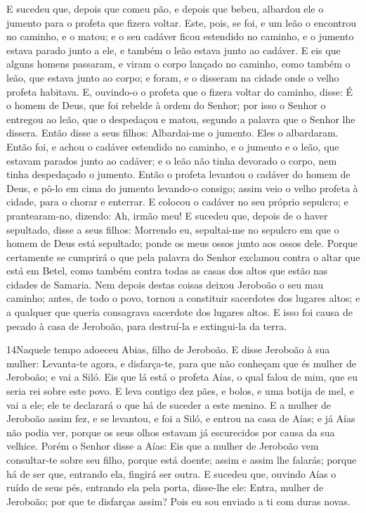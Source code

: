 E sucedeu que, depois que comeu pão, e depois que bebeu, albardou
ele o jumento para o profeta que fizera voltar. Este, pois,
se foi, e um leão o encontrou no caminho, e o matou; e o seu cadáver
ficou estendido no caminho, e o jumento estava parado junto a ele, e
também o leão estava junto ao cadáver. E eis que alguns
homens passaram, e viram o corpo lançado no caminho, como também o
leão, que estava junto ao corpo; e foram, e o disseram na cidade
onde o velho profeta habitava. E, ouvindo-o o profeta que o
fizera voltar do caminho, disse: É o homem de Deus, que foi rebelde
à ordem do Senhor; por isso o Senhor o entregou ao leão, que o
despedaçou e matou, segundo a palavra que o Senhor lhe dissera.
Então disse a seus filhos: Albardai-me o jumento. Eles o
albardaram. Então foi, e achou o cadáver estendido no
caminho, e o jumento e o leão, que estavam parados junto ao cadáver;
e o leão não tinha devorado o corpo, nem tinha despedaçado o
jumento. Então o profeta levantou o cadáver do homem de Deus,
e pô-lo em cima do jumento levando-o consigo; assim veio o velho
profeta à cidade, para o chorar e enterrar. E colocou o
cadáver no seu próprio sepulcro; e prantearam-no, dizendo: Ah, irmão
meu! E sucedeu que, depois de o haver sepultado, disse a seus
filhos: Morrendo eu, sepultai-me no sepulcro em que o homem de Deus
está sepultado; ponde os meus ossos junto aos ossos dele.
Porque certamente se cumprirá o que pela palavra do Senhor
exclamou contra o altar que está em Betel, como também contra todas
as casas dos altos que estão nas cidades de Samaria. Nem
depois destas coisas deixou Jeroboão o seu mau caminho; antes, de
todo o povo, tornou a constituir sacerdotes dos lugares altos; e a
qualquer que queria consagrava sacerdote dos lugares altos. E
isso foi causa de pecado à casa de Jeroboão, para destruí-la e
extingui-la da terra.

\medskip

\lettrine{14} Naquele tempo adoeceu Abias, filho de Jeroboão.
E disse Jeroboão à sua mulher: Levanta-te agora, e disfarça-te,
para que não conheçam que és mulher de Jeroboão; e vai a Siló. Eis
que lá está o profeta Aías, o qual falou de mim, que eu seria rei
sobre este povo. E leva contigo dez pães, e bolos, e uma botija
de mel, e vai a ele; ele te declarará o que há de suceder a este
menino. E a mulher de Jeroboão assim fez, e se levantou, e foi a
Siló, e entrou na casa de Aías; e já Aías não podia ver, porque os
seus olhos estavam já escurecidos por causa da sua velhice.
Porém o Senhor disse a Aías: Eis que a mulher de Jeroboão vem
consultar-te sobre seu filho, porque está doente; assim e assim lhe
falarás; porque há de ser que, entrando ela, fingirá ser outra.
E sucedeu que, ouvindo Aías o ruído de seus pés, entrando ela
pela porta, disse-lhe ele: Entra, mulher de Jeroboão; por que te
disfarças assim? Pois eu sou enviado a ti com duras novas.

